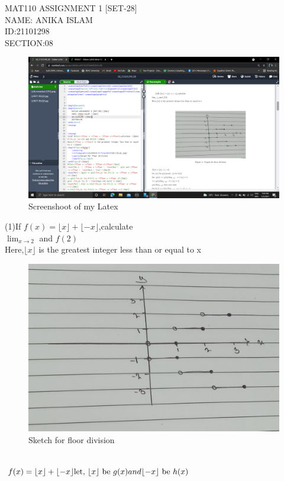\documentclass{article}
\begin{document}
\begin{center}
    MAT110 ASSIGNMENT 1 [SET-28]\\[6pt]
    NAME: ANIKA ISLAM \\[6pt]
    ID:21101298 \\[6pt]
    SECTION:08
\end{center}
\newpage
\begin{figure}[htbp!]
    \centering
    \includegraphics[width=1\linewidth]{Screenshot (205).png}
    \caption{Screenshoot of my Latex}
    \label{fig:my_label}
\end{figure}\newpage 
(1)If $f(x)=\lfloor x \rfloor + \lfloor-x\rfloor$,calculate \\[6pt]
$\lim_{x \to 2}$ and $f(2)$ \\[6pt]
Here,$\lfloor x \rfloor$ is the greatest integer less than or equal to x \\[20pt]
\begin{figure}[htbp!]
    \centering
    \includegraphics[width=0.6\linewidth]{SET-28,Q1.jpg}
    \caption{Sketch for floor division}
    \label{fig:my_label}
\end{figure}\\[10pt]
$f(x)=\lfloor x \rfloor + \lfloor-x\rfloor\\[6pt]
\text{let,}  \  \lfloor x \rfloor \  \text{be} \  g(x) and \lfloor -x \rfloor \  \text{be} \  h(x) \\[6pt]$
\end{document}
